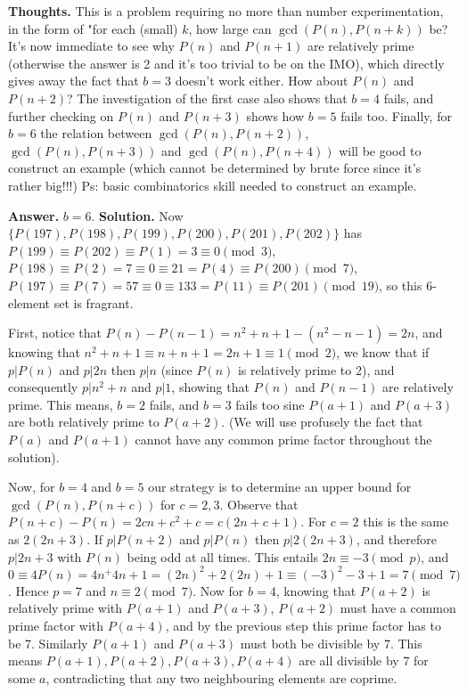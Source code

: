 \documentclass[11pt,a4paper]{article}
\begin{document}
\begin{itemize}
\textbf{Thoughts.} This is a problem requiring no more than number experimentation, in the form of "for each (small) $k$, how large can $\gcd(P(n), P(n+k))$ be? 
It's now immediate to see why $P(n)$ and $P(n+1)$ are relatively prime (otherwise the answer is 2 and it's too trivial to be on the IMO), which directly gives away the fact that $b=3$ doesn't work either. 
How about $P(n)$ and $P(n+2)$? The investigation of the first case also shows that $b=4$ fails, and further checking on $P(n)$ and $P(n+3)$ shows how $b=5$ fails too. 
Finally, for $b=6$ the relation between $\gcd(P(n), P(n+2))$, $\gcd(P(n), P(n+3))$ and $\gcd(P(n), P(n+4))$ will be good to construct an example (which cannot be determined by brute force since it's rather big!!!)
Ps: basic combinatorics skill needed to construct an example. 

\textbf{Answer.} $b=6.$
\textbf{Solution.}
Now $\{P(197), P(198), P(199), P(200), P(201), P(202)\}$ has 
$P(199)\equiv P(202)\equiv P(1)=3\equiv 0\pmod{3}$, 
$P(198)\equiv P(2)=7\equiv 0\equiv 21=P(4)\equiv P(200)\pmod {7}$, 
$P(197)\equiv P(7)=57\equiv 0\equiv 133=P(11)\equiv P(201)\pmod{19}$, so this 6-element set is fragrant. 

First, notice that $P(n)-P(n-1)=n^2+n+1-(n^2-n-1)=2n$, 
and knowing that $n^2+n+1\equiv n+n+1=2n+1\equiv 1\pmod{2}$, 
we know that if $p|P(n)$ and $p|2n$ then $p|n$ (since $P(n)$ is relatively prime to 2), 
and consequently $p|n^2+n$ and $p|1$, showing that $P(n)$ and $P(n-1)$ are relatively prime. 
This means, $b=2$ fails, and $b=3$ fails too sine $P(a+1)$ and $P(a+3)$ are both relatively prime to $P(a+2)$. 
(We will use profusely the fact that $P(a)$ and $P(a+1)$ cannot have any common prime factor throughout the solution). 

Now, for $b=4$ and $b=5$ our strategy is to determine an upper bound for $\gcd(P(n), P(n+c))$ for $c=2, 3$. 
Observe that $P(n+c)-P(n)=2cn+c^2+c=c(2n+c+1)$. 
For $c=2$ this is the same as $2(2n+3)$. 
If $p|P(n+2)$ and $p|P(n)$ then $p|2(2n+3)$, and therefore $p|2n+3$ with $P(n)$ being odd at all times. 
This entails $2n\equiv -3\pmod{p}$, 
and $0\equiv 4P(n)=4n^+4n+1=(2n)^2+2(2n)+1\equiv (-3)^2-3+1=7\pmod{7}$. 
Hence $p=7$ and $n\equiv 2\pmod{7}$. 
Now for $b=4$, knowing that $P(a+2)$ is relatively prime with $P(a+1)$ and $P(a+3)$, $P(a+2)$ must have a common prime factor with $P(a+4)$, 
and by the previous step this prime factor has to be 7. 
Similarly $P(a+1)$ and $P(a+3)$ must both be divisible by 7. 
This means $P(a+1), P(a+2), P(a+3), P(a+4)$ are all divisible by 7 for some $a$, contradicting that any two neighbouring elements are coprime. 


\end{itemize}
\end{document}

